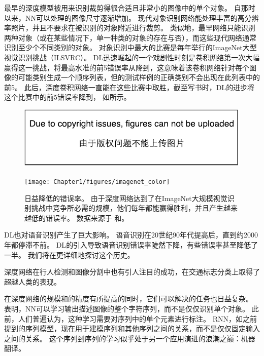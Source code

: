 最早的深度模型被用来识别裁剪得很合适且非常小的图像中的单个对象\citep{Rumelhart86}。
自那时以来，\gls{NN}可以处理的图像尺寸逐渐增加。
现代对象识别网络能处理丰富的高分辨率照片，并且不要求在被识别的对象附近进行裁剪\citep{Krizhevsky-2012}。
类似地，最早网络只能识别两种对象（或在某些情况下，单一种类的对象的存在与否），而这些现代网络通常识别至少个不同类别的对象。
对象识别中最大的比赛是每年举行的ImageNet大型视觉识别挑战（ILSVRC）。
\gls{DL}迅速崛起的一个戏剧性时刻是卷积网络第一次大幅赢得这一挑战，将最高水准的前5错误率从降到\citep{Krizhevsky-2012}，这意味着该卷积网络针对每个图像的可能类别生成一个顺序列表，但的测试样例的正确类别不会出现在此列表中的前5。
此后，深度卷积网络一直能在这些比赛中取胜，截至写书时，\gls{DL}的进步将这个比赛中的前5错误率降到， 如所示。
\begin{figure}[!htb]
\ifOpenSource
\centerline{\includegraphics{figure.pdf}}
\else
\centerline{\texttt{[image: Chapter1/figures/imagenet\_color]}}
\fi
\caption{日益降低的错误率。
由于深度网络达到了在ImageNet大规模视觉识别挑战中竞争所必需的规模，他们每年都能赢得胜利，并且产生越来越低的错误率。
数据来源于 \citet{russakovsky2014imagenet}和\citet{He-et-al-arxiv2015}。}
\label{fig:chap1_imagenet_color}
\end{figure}


\gls{DL}也对语音识别产生了巨大影响。
语音识别在20世纪90年代提高后，直到约2000年都停滞不前。
\gls{DL}的引入\citep{dahl2010phonerec,Deng-2010,Seide2011,Hinton-et-al-2012}导致语音识别错误率陡然下降，有些错误率甚至降低了一半。 
我们将在更详细地探讨这个历史。

深度网络在行人检测和图像分割中也有引人注目的成功\citep{sermanet-cvpr-13,Farabet-et-al-2013,couprie-iclr-13}，在交通标志分类上取得了超越人类的表现\citep{Ciresan-et-al-2012}。

在深度网络的规模和的精度有所提高的同时，它们可以解决的任务也日益复杂。
\citet{Goodfellow+et+al-ICLR2014a}表明，\gls{NN}可以学习输出描述图像的整个字符序列，而不是仅仅识别单个对象。
此前，人们普遍认为，这种学习需要对序列中的单个元素进行标注\citep{Gulcehre+Bengio-arxiv-2013}。
\gls{RNN}，如之前提到的序列模型，现在用于建模序列和其他序列之间的关系，而不是仅仅固定输入之间的关系。
这个序列到序列的学习似乎处于另一个应用演进的浪潮之巅：机器翻译\citep{Sutskever-et-al-NIPS2014,Bahdanau-et-al-ICLR2015-small}。

